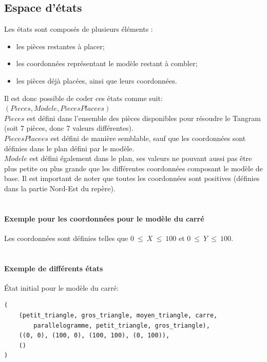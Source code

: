 \documentclass[a4paper, 11pt]{report}
\begin{document}
        
        \subsection{Espace d'états}

		Les états sont composés de plusieurs éléments :
		\begin{itemize}
			\item les pièces restantes à placer;
			\item les coordonnées représentant le modèle restant à combler;
			\item les pièces déjà placées, ainsi que leurs coordonnées.
		\end{itemize}

		Il est donc possible de coder ces états comme suit:\\
		$(Pieces, Modele, PiecesPlacees)$\\

		$Pieces$ est défini dans l'ensemble des pièces disponibles pour résoudre le Tangram (soit 7 pièces, donc 7 valeurs différentes).\\
		$PiecesPlacees$ est défini de manière semblable, sauf que les coordonnées sont définies dans le plan défini par le modèle.\\
		$Modele$ est défini également dans le plan, ses valeurs ne
pouvant aussi pas être plus petite ou plus grande que les différentes coordonnées composant le modèle de base. Il est important de noter que toutes les coordonnées sont positives (définies dans la partie Nord-Est du repère).\\ \ \\

		\paragraph{Exemple pour les coordonnées pour le modèle du carré\\}
 
		Les coordonnées sont définies telles que $0\ \leq\ X\ \leq\ 100$ et $0\ \leq\ Y\ \leq\ 100$.\\ \ \\

		\paragraph{Exemple de différents états\\}

		État initial pour le modèle du carré:\\
\begin{verbatim}
(
	(petit_triangle, gros_triangle, moyen_triangle, carre,	
		parallelogramme, petit_triangle, gros_triangle),
	((0, 0), (100, 0), (100, 100), (0, 100)),						
	()														
)
\end{verbatim}
\end{document}
